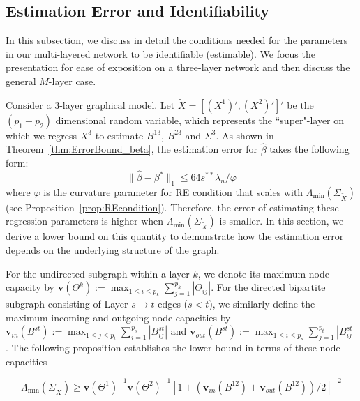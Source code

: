 \subsection{Estimation Error and Identifiability}\label{sec:identifiability}

In this subsection, we discuss in detail the conditions needed for the parameters in our multi-layered network to be identifiable (estimable). 
We focus the presentation for ease of exposition on a three-layer network and then discuss the general $M$-layer case.

Consider a $3$-layer graphical model. Let $\widetilde{X} = [(X^1)', (X^2)']'$ be the $(p_1+p_2)$ dimensional random variable, which represents the 
``super"-layer on which we regress $X^3$ to estimate $B^{13}$, $B^{23}$ and $\Sigma^3$. As shown in Theorem~\ref{thm:ErrorBound_beta}, the estimation error for $\widehat{\beta}$ takes the following form:
\begin{equation*}
\|\widehat{\beta}-\beta^*\|_1 \leq 64s^{**}\lambda_n/\varphi 
\end{equation*}
where $\varphi$ is the curvature parameter for RE condition that scales with $\Lambda_{\min}(\Sigma_{\widetilde{X}})$ (see Proposition~\ref{prop:REcondition}). Therefore, the error of estimating these regression parameters is higher when $\Lambda_{\min}(\Sigma_{\tilde{X}})$ is smaller. In this section, we derive a lower bound on this quantity to demonstrate how the estimation error depends on the underlying structure of the graph.

For the undirected subgraph within a layer $k$, we denote its maximum node capacity by $\mathbf{v}(\Theta^k):= \max_{1 \le i \le p_k} \sum_{j=1}^{p_k} |\Theta_{ij}|$. For the directed bipartite subgraph consisting of Layer $s \rightarrow t$ edges ($s<t$), we similarly define the maximum incoming and outgoing node capacities by $\mathbf{v}_{in}(B^{st}):= \max_{1 \le j \le p_t} \sum_{i=1}^{p_s}|B^{st}_{ij}|$ and $\mathbf{v}_{out}(B^{st}):= \max_{1 \le i \le p_s} \sum_{j=1}^{p_t} |B^{st}_{ij}|$. The following proposition establishes the lower bound in terms of these node capacities

\begin{proposition}\label{prop:RE-bound}
\begin{equation*}
\Lambda_{\min}(\Sigma_{\widetilde{X}}) \ge \mathbf{v}(\Theta^1)^{-1} \mathbf{v}(\Theta^2)^{-1} 
\left[1+\left(\mathbf{v}_{in}(B^{12})+\mathbf{v}_{out}(B^{12})\right)/2 \right]^{-2}
\end{equation*}
\end{proposition}


